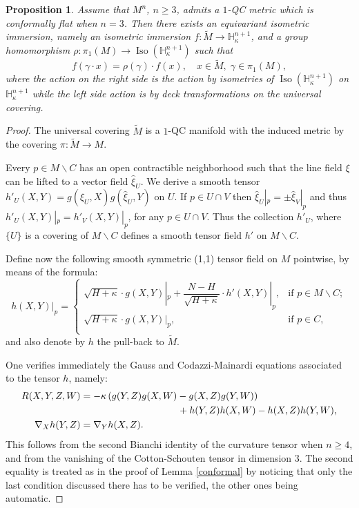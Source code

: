 \documentclass[10pt]{amsart}
\let\moins\smallsetminus
\DeclareMathOperator{\Iso}{Iso}
\newtheorem{proposition}[theorem]{Proposition}
\theoremstyle{definition}
\theoremstyle{remark}
\numberwithin{equation}{section}
\begin{document}
\begin{proposition}\label{immerse}
Assume that $M^n$, $n\geq3$, admits a $1$-QC metric which is conformally flat when $n=3$.
Then there exists an equivariant
isometric immersion, namely an isometric immersion
$f:\widetilde{M}\to \mathbb H_{\kappa}^{n+1}$, and
a group homomorphism $\rho:\pi_1(M)\to \Iso(\mathbb H_{\kappa}^{n+1})$ such that
\[ f(\gamma\cdot x)=\rho(\gamma)\cdot f(x),\quad x\in \widetilde{M},\; \gamma \in \pi_1(M),\]
where the action on the right side is the action by isometries of
$\Iso(\mathbb H_{\kappa}^{n+1})$ on $\mathbb H_{\kappa}^{n+1}$ while the left side action is by
deck transformations on the universal covering.
\end{proposition}
\begin{proof}
The universal covering $\widetilde{M}$ is a
$1$-QC manifold with the induced metric by the covering $\pi:\widetilde{M}\to M$.

Every $p\in M\moins C$ has an open contractible neighborhood such that the line field $\xi$
can be lifted to a vector field $\widehat{\xi}_U$. We derive a smooth tensor
$h'_U(X,Y)=g(\widehat{\xi}_U,X)g(\widehat{\xi}_U,Y)$ on $U$. If $p\in U\cap V$ then
$\widehat{\xi}_U|_p=\pm \widehat{\xi}_V|_p$ and thus
$h'_U(X,Y)|_p=h'_V(X,Y)|_p$, for any $p\in U\cap V$. Thus the collection $h'_U$, where $\{U\}$
is a covering of $M\moins C$ defines a smooth tensor field $h'$ on $M\moins C$.

Define now the following smooth symmetric (1,1) tensor field on $M$ pointwise, by means of
the formula:
\[h(X,Y)|_p=\begin{cases}
\sqrt{H+\kappa}\cdot g(X,Y)|_p+ \dfrac{N-H}{\sqrt{H+\kappa}}\cdot h'(X,Y)|_p, &\text{if }p\in M\moins C; \\[3pt]
\sqrt{H+\kappa} \cdot g(X,Y)|_p, &\text{if }p\in C,
\\
\end{cases}
\]
and also denote by $h$ the pull-back to $\widetilde{M}$.

One verifies immediately the Gauss and Codazzi-Mainardi equations associated to the tensor $h$, namely:
\begin{align*}
R(X,Y,Z,W)&=-\kappa\left(g(Y,Z)g(X,W)-g(X,Z)g(Y,W)\right)\\
&\hspace*{3.55cm}+h(Y,Z)h(X,W)- h(X,Z)h(Y,W),\\
\nabla_Xh(Y,Z)&=\nabla_Yh(X,Z).
\end{align*}
This follows from the second Bianchi identity of the curvature tensor when
$n\geq4$, and from the vanishing of the Cotton-Schouten tensor
in dimension $3$. The second equality is treated as in
the proof of Lemma \ref{conformal} by noticing that only the last
condition discussed there has to be verified,
the other ones being automatic.


\end{proof}
\end{document}
